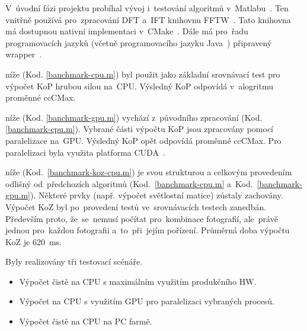 V~úvodní fázi projektu probíhal vývoj i~testování algoritmů v~Matlabu~\cite{matlab}. Ten vnitřně používá pro~zpracování DFT a~IFT knihovnu FFTW~\cite{fftw}. Tato knihovna má dostupnou nativní implementaci v~CMake~\cite{cmake}. Dále má pro~řadu programovacích jazyků (včetně programovacího jazyku Java~\cite{FFT-java}) připravený wrapper~\cite{wrapper}.

níže (Kod. \ref{banchmark-cpu.m}) byl použit jako základní srovnávací test pro výpočet KoP hrubou silou na~CPU. Výsledný KoP odpovídá v~alogritmu proměnné ccCMax.

níže (Kod. \ref{banchmark-gpu.m}) vychází z~původního zpracování (Kod. \ref{banchmark-cpu.m}). Vybrané části výpočtu KoP jsou zpracovány pomocí paralelizace na~GPU. Výsledný KoP opět odpovídá proměnné ccCMax. Pro paralelizaci byla využita platforma CUDA~\cite{cuda}.

níže (Kod.~\ref{banchmark-koz-cpu.m}) je svou strukturou a celkovým provedením odlišný od~předchozích algoritmů (Kod.~\ref{banchmark-cpu.m} a~Kod.~\ref{banchmark-gpu.m}). Některé prvky (např. výpočet světlostní matice) zůstaly zachovány. Výpočet KoZ byl po~provedení testů ve~srovnávacích testech zanedbán. Především proto, že~se~nemusí počítat pro~kombinace fotografií, ale~právě jednou pro~každou fotografii a~to~při~jejím pořízení. Průměrná doba výpočtu KoZ je 620~ms.

Byly realizovány tři testovací scénáře.
\begin{itemize}
	\setlength{\parskip}{0pt}
	\setlength{\itemsep}{0pt}
	\item {Výpočet čistě na CPU s maximálním využitím produkčního HW.}
	\item {Výpočet na CPU s využitím GPU pro paralelizaci vybraných procesů.}
	\item {Výpočet čistě na CPU na PC farmě.}
\end{itemize}

